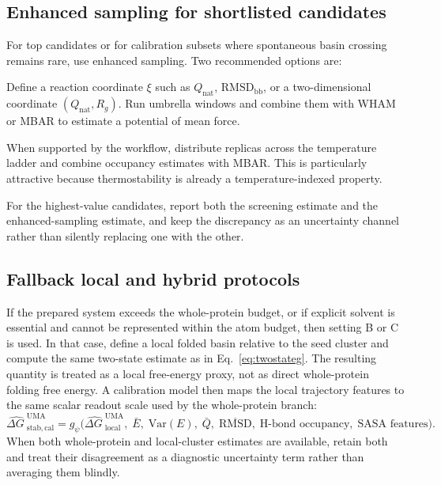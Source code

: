 \documentclass[11pt]{article}
\newcommand{\Var}{\ensuremath{\mathrm{Var}}}
\newcommand{\dG}{\ensuremath{\Delta G \ }}
\begin{document}
\subsection{Enhanced sampling for shortlisted candidates}

For top candidates or for calibration subsets where spontaneous basin crossing remains rare, use enhanced sampling. Two recommended options are:
\begin{description}[leftmargin=1.5em,style=nextline]
    \item[Umbrella sampling.] Define a reaction coordinate $\xi$ such as $Q_{\mathrm{nat}}$, $\mathrm{RMSD}_{\mathrm{bb}}$, or a two-dimensional coordinate $(Q_{\mathrm{nat}},R_g)$. Run umbrella windows and combine them with WHAM or MBAR to estimate a potential of mean force.
    \item[Temperature exchange or stratified replicas.] When supported by the workflow, distribute replicas across the temperature ladder and combine occupancy estimates with MBAR. This is particularly attractive because thermostability is already a temperature-indexed property.
\end{description}
For the highest-value candidates, report both the screening estimate and the enhanced-sampling estimate, and keep the discrepancy as an uncertainty channel rather than silently replacing one with the other.

\subsection{Fallback local and hybrid protocols}

If the prepared system exceeds the whole-protein budget, or if explicit solvent is essential and cannot be represented within the atom budget, then setting B or C is used. In that case, define a local folded basin relative to the seed cluster and compute the same two-state estimate as in Eq.~\eqref{eq:twostateg}. The resulting quantity is treated as a local free-energy proxy, not as direct whole-protein folding free energy. A calibration model then maps the local trajectory features to the same scalar readout scale used by the whole-protein branch:
\begin{equation}
    \widehat{\dG}^{\mathrm{UMA}}_{\mathrm{stab,cal}} = g_\psi\Big(\widehat{\dG}^{\mathrm{UMA}}_{\mathrm{local}},\; \bar E,\; \Var(E),\; \bar Q,\; \overline{\mathrm{RMSD}},\; \text{H-bond occupancy},\; \text{SASA features}\Big).
\end{equation}
When both whole-protein and local-cluster estimates are available, retain both and treat their disagreement as a diagnostic uncertainty term rather than averaging them blindly.
\end{document}
